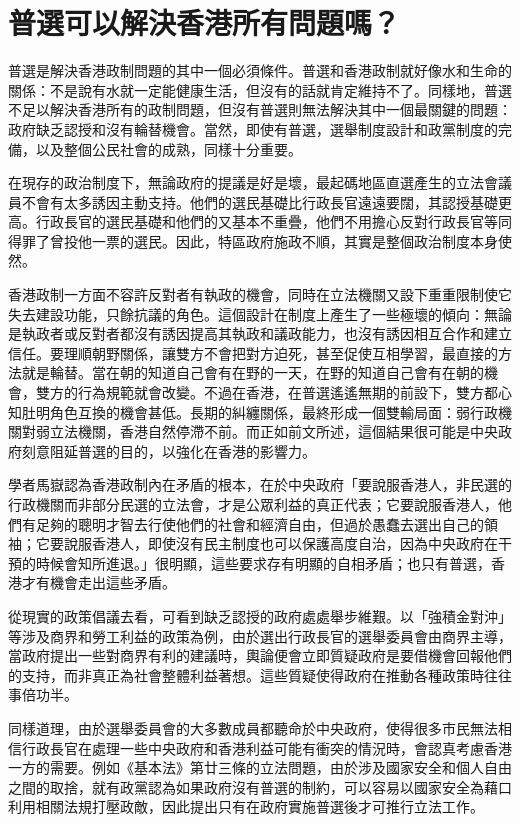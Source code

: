 \section{普選可以解決香港所有問題嗎？}

普選是解決香港政制問題的其中一個必須條件。普選和香港政制就好像水和生命的關係：不是說有水就一定能健康生活，但沒有的話就肯定維持不了。同樣地，普選不足以解決香港所有的政制問題，但沒有普選則無法解決其中一個最關鍵的問題：政府缺乏認授和沒有輪替機會。當然，即使有普選，選舉制度設計和政黨制度的完備，以及整個公民社會的成熟，同樣十分重要。

在現存的政治制度下，無論政府的提議是好是壞，最起碼地區直選產生的立法會議員不會有太多誘因主動支持。他們的選民基礎比行政長官遠遠要闊，其認授基礎更高。行政長官的選民基礎和他們的又基本不重疊，他們不用擔心反對行政長官等同得罪了曾投他一票的選民。因此，特區政府施政不順，其實是整個政治制度本身使然。

香港政制一方面不容許反對者有執政的機會，同時在立法機關又設下重重限制使它失去建設功能，只餘抗議的角色。這個設計在制度上產生了一些極壞的傾向：無論是執政者或反對者都沒有誘因提高其執政和議政能力，也沒有誘因相互合作和建立信任。要理順朝野關係，讓雙方不會把對方迫死，甚至促使互相學習，最直接的方法就是輪替。當在朝的知道自己會有在野的一天，在野的知道自己會有在朝的機會，雙方的行為規範就會改變。不過在香港，在普選遙遙無期的前設下，雙方都心知肚明角色互換的機會甚低。長期的糾纏關係，最終形成一個雙輸局面：弱行政機關對弱立法機關，香港自然停滯不前。而正如前文所述，這個結果很可能是中央政府刻意阻延普選的目的，以強化在香港的影響力。

學者馬嶽認為香港政制內在矛盾的根本，在於中央政府「要說服香港人，非民選的行政機關而非部分民選的立法會，才是公眾利益的真正代表；它要說服香港人，他們有足夠的聰明才智去行使他們的社會和經濟自由，但過於愚蠢去選出自己的領袖；它要說服香港人，即使沒有民主制度也可以保護高度自治，因為中央政府在干預的時候會知所進退。」很明顯，這些要求存有明顯的自相矛盾；也只有普選，香港才有機會走出這些矛盾。

從現實的政策倡議去看，可看到缺乏認授的政府處處舉步維艱。以「強積金對沖」等涉及商界和勞工利益的政策為例，由於選出行政長官的選舉委員會由商界主導，當政府提出一些對商界有利的建議時，輿論便會立即質疑政府是要借機會回報他們的支持，而非真正為社會整體利益著想。這些質疑使得政府在推動各種政策時往往事倍功半。

同樣道理，由於選舉委員會的大多數成員都聽命於中央政府，使得很多市民無法相信行政長官在處理一些中央政府和香港利益可能有衝突的情況時，會認真考慮香港一方的需要。例如《基本法》第廿三條的立法問題，由於涉及國家安全和個人自由之間的取捨，就有政黨認為如果政府沒有普選的制約，可以容易以國家安全為藉口利用相關法規打壓政敵，因此提出只有在政府實施普選後才可推行立法工作。

